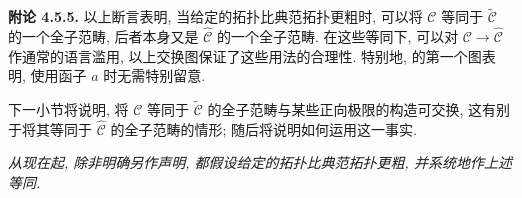 \medskip
\noindent{}\textbf{附论 4.5.5.}
以上断言表明, 当给定的拓扑比典范拓扑更粗时,
可以将 \(\mathscr C\) 等同于 \(\widetilde{\mathscr C}\) 的一个全子范畴,
后者本身又是 \(\widehat{\mathscr C}\) 的一个全子范畴.
在这些等同下, 可以对 \(\mathscr C\to
\widehat{\mathscr C}\) 作通常的语言滥用,
以上交换图保证了这些用法的合理性.
特别地,  的第一个图表明,
使用函子 \(a\) 时无需特别留意.

下一小节将说明, 将 \(\mathscr C\) 等同于
\(\widetilde{\mathscr C}\) 的全子范畴与某些正向极限的构造可交换,
这有别于将其等同于 \(\widehat{\mathscr C}\) 的全子范畴的情形;
随后将说明如何运用这一事实.

\emph{从现在起, 除非明确另作声明,
都假设给定的拓扑比典范拓扑更粗,
并系统地作上述等同.}

